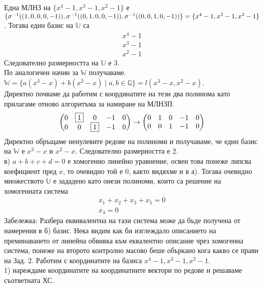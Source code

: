 \documentclass[a4paper, 12pt, oneside]{article}
\begin{document}
Една МЛНЗ на \(\{x^4 - 1, x^3 - 1, x^2 - 1\}\) е \\
\(\{\sigma^{-1}((1, 0, 0, 0, -1)), \sigma^{-1}((0, 1, 0, 0, -1)), \sigma^{-1}((0, 0, 1, 0, -1))\} = \\
\{x^4 - 1, x^3 - 1, x^2 - 1\}\). Тогава един базис на \(\mathbb{U}\) са
\begin{align*}
    x^4 - 1 \\
    x^3 - 1 \\
    x^2 - 1
\end{align*}
Следователно размерността на \(\mathbb{U}\) е 3. \\
По аналогичен начин за \(\mathbb{W}\) получаваме. \\
\(\mathbb{W} = \{a(x^3 - x) + b(x^2 - x) \; | \; a, b \in \mathbb{Q}\} = l(x^3 - x, x^2 - x)\). \\
Директно почваме да работим с координатите на тези два полинома като прилагаме отново алгоритъма за намиране на МЛНЗП.
\begin{align*}
    \begin{pmatrix}
        0 & \fbox{1} & 0 & -1 & 0 \\
        0 & 0 & \fbox{1} & -1 & 0
    \end{pmatrix} \to \begin{pmatrix}
        0 & 1 & 0 & -1 & 0 \\
        0 & 0 & 1 & -1 & 0
    \end{pmatrix}
\end{align*}
Директно обръщаме ненулевите редове на полиноми и получаваме, че един базис на \(\mathbb{W}\)
е \(x^3 - x\) и \(x^2 - x\). Следователно размерността е 2. \\
в) \(a + b + c + d = 0\) е хомогенно линейно уравнение, освен това понеже липсва коефициент пред \(x\),
то очевидно той е 0, както видяхме и в а). 
Тогава очевидно множеството \(\mathbb{U}\) е зададено като онези полиноми, които са решение на хомогенната система
\begin{align*}
    x_1 + x_2 + x_3 + x_5 = 0 \\
    x_4 = 0
\end{align*}
Забележка: Разбера еквивалентна на тази система може да бъде получена от намерения в б) базис.
Нека видим как би изглеждало описанието на преминаването от линейна обвивка към еквалентно описание чрез хомогенна система,
понеже на второто контролно масово беше объркано кога какво се прави на Зад. 2.
Работим с координатите на базиса \(x^4 - 1, x^3 - 1, x^2 - 1\). \\
1) нареждаме координатите на координатните вектори по редове и решаваме съответната ХС.
\end{document}
